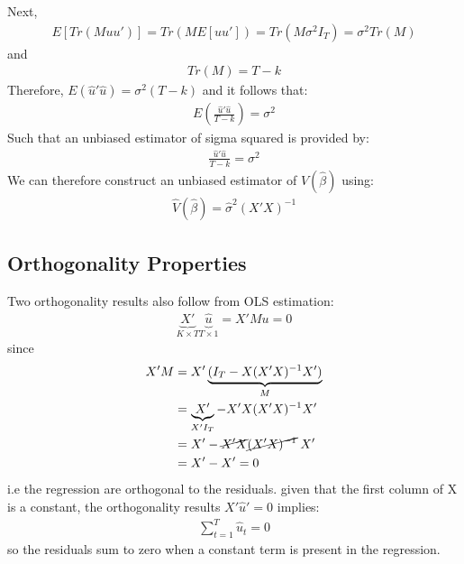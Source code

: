 \documentclass[letterpaper,10pt,english]{jupyterBook}
\begin{document}
Next,
\begin{equation*}
\begin{split}E[Tr(Muu')] = Tr(ME[uu']) = Tr(M\sigma^2I_T) = \sigma^2Tr(M)\end{split}
\end{equation*}
and
\begin{equation*}
\begin{split}Tr(M) = T - k\end{split}
\end{equation*}
Therefore, \(E(\hat u ' \hat u) = \sigma^2(T-k)\) and it follows that:
\begin{equation*}
\begin{split}E( \frac{\hat u '\hat u} {T -k }) = \sigma^2\end{split}
\end{equation*}
Such that an unbiased estimator of sigma squared is provided by:
\begin{equation*}
\begin{split}\frac{\hat u '\hat u} {T -k } = \sigma^2\end{split}
\end{equation*}
We can therefore construct an unbiased estimator of \(V(\hat \beta)\)
using:
\begin{equation*}
\begin{split}\hat V( \hat \beta) = \hat\sigma^2(X'X)^{-1}\end{split}
\end{equation*}

\subsection{Orthogonality Properties}
\label{\detokenize{parts/econometric-theory/linearmodels:orthogonality-properties}}
Two orthogonality results also follow from OLS estimation:
\begin{equation*}
\begin{split}\underbrace{X'}_{K \times T} \underbrace{\hat u}_{T \times 1} = X'Mu = 0\end{split}
\end{equation*}
since
\begin{equation*}
\begin{split}\begin{aligned}
    X'M &= X'\underbrace{(I_T - X(X'X)^{-1}X')}_{M} \\
    &= \underbrace{X'}_{X'I_T} - X'X (X'X)^{-1} X' \\
    &=  X' - \cancel{X'X} \cancel{(X'X)^{-1}} \; X' \\
    &= X' - X' = 0
\end{aligned}\end{split}
\end{equation*}
i.e the regression are orthogonal to the residuals. given that the first
column of X is a constant, the orthogonality results \(X'\hat u' = 0\)
implies:
\begin{equation*}
\begin{split}\sum_{t=1}^T \hat u_t = 0\end{split}
\end{equation*}
so the residuals sum to zero when a constant term is present in the
regression.
\end{document}
